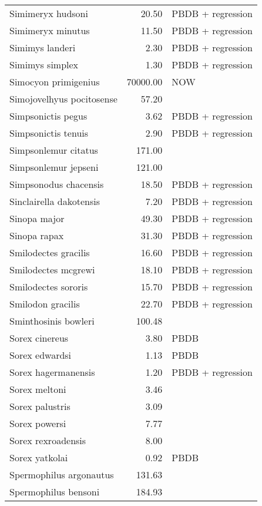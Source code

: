 \begin{table}[ht]
\begin{tabular}{lrl}
  Simimeryx hudsoni & 20.50 & PBDB + regression \\ 
  Simimeryx minutus & 11.50 & PBDB + regression \\ 
  Simimys landeri & 2.30 & PBDB + regression \\ 
  Simimys simplex & 1.30 & PBDB + regression \\ 
  Simocyon primigenius & 70000.00 & NOW \\ 
  Simojovelhyus pocitosense & 57.20 & \cite{Wang1999} \\ 
  Simpsonictis pegus & 3.62 & PBDB + regression \\ 
  Simpsonictis tenuis & 2.90 & PBDB + regression \\ 
  Simpsonlemur citatus & 171.00 & \cite{Soligo2006} \\ 
  Simpsonlemur jepseni & 121.00 & \cite{Soligo2006} \\ 
  Simpsonodus chacensis & 18.50 & PBDB + regression \\ 
  Sinclairella dakotensis & 7.20 & PBDB + regression \\ 
  Sinopa major & 49.30 & PBDB + regression \\ 
  Sinopa rapax & 31.30 & PBDB + regression \\ 
  Smilodectes gracilis & 16.60 & PBDB + regression \\ 
  Smilodectes mcgrewi & 18.10 & PBDB + regression \\ 
  Smilodectes sororis & 15.70 & PBDB + regression \\ 
  Smilodon gracilis & 22.70 & PBDB + regression \\ 
  Sminthosinis bowleri & 100.48 & \cite{Tomiya2013} \\ 
  Sorex cinereus & 3.80 & PBDB \\ 
  Sorex edwardsi & 1.13 & PBDB \\ 
  Sorex hagermanensis & 1.20 & PBDB + regression \\ 
  Sorex meltoni & 3.46 & \cite{Tomiya2013} \\ 
  Sorex palustris & 3.09 & \cite{Smith2004} \\ 
  Sorex powersi & 7.77 & \cite{Tomiya2013} \\ 
  Sorex rexroadensis & 8.00 & \cite{McKenna2011} \\ 
  Sorex yatkolai & 0.92 & PBDB \\ 
  Spermophilus argonautus & 131.63 & \cite{Tomiya2013} \\ 
  Spermophilus bensoni & 184.93 & \cite{Tomiya2013} \\ 

\end{tabular}
\end{table}
